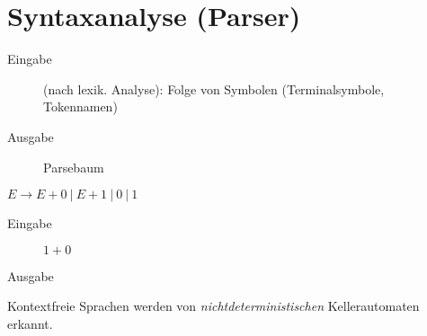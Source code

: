 \chapter{Syntaxanalyse (Parser)}
\begin{description}
    \item[Eingabe] (nach lexik. Analyse): Folge von Symbolen (Terminalsymbole, Tokennamen)
    \item[Ausgabe] Parsebaum
\end{description}
\Bsp $E \to E+0\ |\ E+1\ |\ 0\ |\ 1$
\begin{description}
 \item[Eingabe] $1+0$
 \item[Ausgabe] 
\end{description}
\Satz Kontextfreie Sprachen werden von \emph{nichtdeterministischen} Kellerautomaten erkannt.
